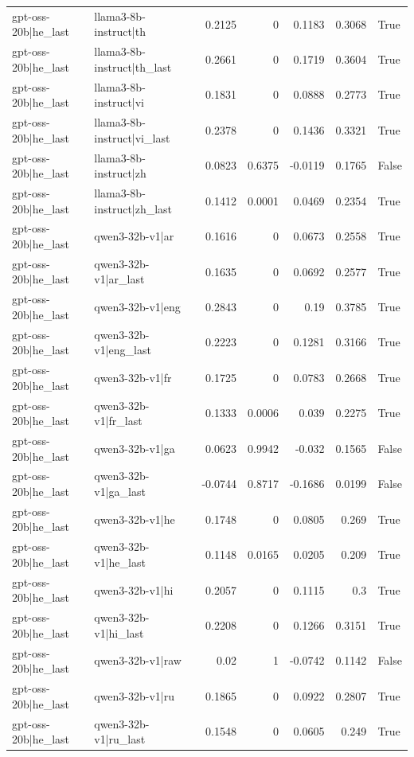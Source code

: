 \begin{table}
\begin{tabular}{l l r r r r l}
gpt-oss-20b|he_last & llama3-8b-instruct|th & 0.2125 & 0 & 0.1183 & 0.3068 & True \\
gpt-oss-20b|he_last & llama3-8b-instruct|th_last & 0.2661 & 0 & 0.1719 & 0.3604 & True \\
gpt-oss-20b|he_last & llama3-8b-instruct|vi & 0.1831 & 0 & 0.0888 & 0.2773 & True \\
gpt-oss-20b|he_last & llama3-8b-instruct|vi_last & 0.2378 & 0 & 0.1436 & 0.3321 & True \\
gpt-oss-20b|he_last & llama3-8b-instruct|zh & 0.0823 & 0.6375 & -0.0119 & 0.1765 & False \\
gpt-oss-20b|he_last & llama3-8b-instruct|zh_last & 0.1412 & 0.0001 & 0.0469 & 0.2354 & True \\
gpt-oss-20b|he_last & qwen3-32b-v1|ar & 0.1616 & 0 & 0.0673 & 0.2558 & True \\
gpt-oss-20b|he_last & qwen3-32b-v1|ar_last & 0.1635 & 0 & 0.0692 & 0.2577 & True \\
gpt-oss-20b|he_last & qwen3-32b-v1|eng & 0.2843 & 0 & 0.19 & 0.3785 & True \\
gpt-oss-20b|he_last & qwen3-32b-v1|eng_last & 0.2223 & 0 & 0.1281 & 0.3166 & True \\
gpt-oss-20b|he_last & qwen3-32b-v1|fr & 0.1725 & 0 & 0.0783 & 0.2668 & True \\
gpt-oss-20b|he_last & qwen3-32b-v1|fr_last & 0.1333 & 0.0006 & 0.039 & 0.2275 & True \\
gpt-oss-20b|he_last & qwen3-32b-v1|ga & 0.0623 & 0.9942 & -0.032 & 0.1565 & False \\
gpt-oss-20b|he_last & qwen3-32b-v1|ga_last & -0.0744 & 0.8717 & -0.1686 & 0.0199 & False \\
gpt-oss-20b|he_last & qwen3-32b-v1|he & 0.1748 & 0 & 0.0805 & 0.269 & True \\
gpt-oss-20b|he_last & qwen3-32b-v1|he_last & 0.1148 & 0.0165 & 0.0205 & 0.209 & True \\
gpt-oss-20b|he_last & qwen3-32b-v1|hi & 0.2057 & 0 & 0.1115 & 0.3 & True \\
gpt-oss-20b|he_last & qwen3-32b-v1|hi_last & 0.2208 & 0 & 0.1266 & 0.3151 & True \\
gpt-oss-20b|he_last & qwen3-32b-v1|raw & 0.02 & 1 & -0.0742 & 0.1142 & False \\
gpt-oss-20b|he_last & qwen3-32b-v1|ru & 0.1865 & 0 & 0.0922 & 0.2807 & True \\
gpt-oss-20b|he_last & qwen3-32b-v1|ru_last & 0.1548 & 0 & 0.0605 & 0.249 & True \\

\end{tabular}
\end{table}
